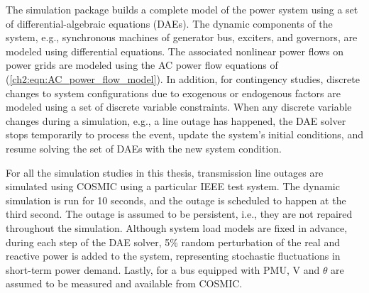 The simulation package builds a complete model of the power system using a set of differential-algebraic equations (DAEs). The dynamic components of the system, e.g., synchronous machines of generator bus, exciters, and governors, are modeled using differential equations. The associated nonlinear power flows on power grids are modeled using the AC power flow equations of (\ref{ch2:eqn:AC_power_flow_model}).  
In addition, for contingency studies, discrete changes to system configurations due to exogenous or endogenous factors are modeled using a set of discrete variable constraints. When any discrete variable changes during a simulation, e.g., a line outage has happened, the DAE solver stops temporarily to process the event, update the system's initial conditions, and resume solving the set of DAEs with the new system condition.

For all the simulation studies in this thesis, transmission line outages are simulated using COSMIC using a particular IEEE test system. The dynamic simulation is run for 10 seconds, and the outage is scheduled to happen at the third second. The outage is assumed to be persistent, i.e., they are not repaired throughout the simulation. Although system load models are fixed in advance, during each step of the DAE solver, 5\% random perturbation of the real and reactive power is added to the system, representing stochastic fluctuations in short-term power demand. Lastly, for a bus equipped with PMU, V and $\theta$ are assumed to be measured and available from COSMIC.

